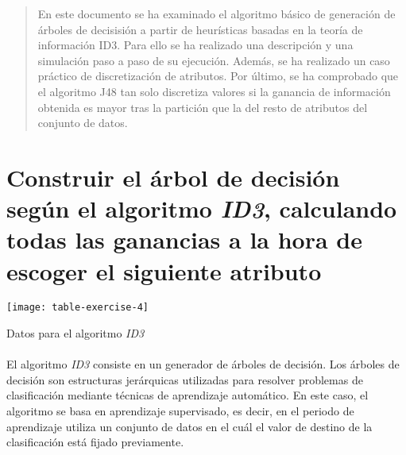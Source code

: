 \documentclass[10pt, a4paper,spanish]{article}
\begin{document}
	\maketitle %

	\thispagestyle{fancy} %



	\begin{abstract}
		\noindent En este documento se ha examinado el algoritmo básico de generación de árboles de decisisión a partir de heurísticas basadas en la teoría de información ID3. Para ello se ha realizado una descripción y una simulación paso a paso de su ejecución. Además, se ha realizado un caso práctico de discretización de atributos. Por último, se ha comprobado que el algoritmo J48 tan solo discretiza valores si la ganancia de información obtenida es mayor tras la partición que la del resto de atributos del conjunto de datos.
	\end{abstract}


	\setcounter{section}{3}

	\section{Construir el árbol de decisión según el algoritmo \emph{ID3}, calculando todas las ganancias a la hora de escoger el siguiente atributo}
	\label{e4}

		\begin{table}[h]
			\begin{center}
				\texttt{[image: table-exercise-4]}
			\end{center}
			\caption{Datos para el algoritmo \emph{ID3}}
			\label{e4:table}
		\end{table}

		\paragraph{}
		El algoritmo \emph{ID3} consiste en un generador de árboles de decisión. Los árboles de decisión son estructuras jerárquicas utilizadas para resolver problemas de clasificación mediante técnicas de aprendizaje automático. En este caso, el algoritmo se basa en aprendizaje supervisado, es decir, en el periodo de aprendizaje utiliza un conjunto de datos en el cuál el valor de destino de la clasificación está fijado previamente.
\end{document}
